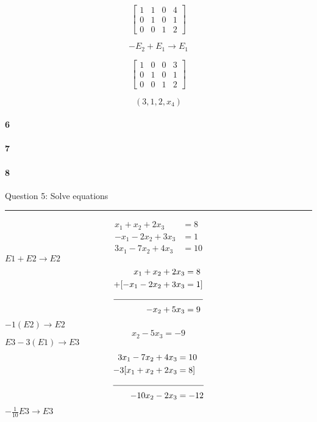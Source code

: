 \documentclass[a4paper,11pt,twoside]{report}
\begin{document}
\[\begin{bmatrix} 1 & 1 & 0 & 4 \\ 0 & 1 & 0 & 1 \\ 0 & 0 & 1 & 2 \end{bmatrix} \]

\[-E_2 + E_1 \to E_1\]

\[\begin{bmatrix} 1 & 0 & 0 & 3 \\ 0 & 1 & 0 & 1 \\ 0 & 0 & 1 & 2 \end{bmatrix} \]

\[\boxed{(3,1,2,x_4)}\]










\paragraph{6}

\paragraph{7}

\paragraph{8}







\noindent Question 5: Solve equations\\ \hrule
\begin{align*}
	x_1 + x_2 + 2x_3 &=  8 \\
	-x_1 - 2x_2 + 3x_3 &= 1 \\
	3x_1-7x_2+4x_3 &=  10
\end{align*}
$E 1 + E 2 \to E 2$
\begin{align*}
	x_1+x_2+2x_3 &= 8 \\
	+[-x_1 -2x_2+3x_3 &= 1] \\
	\cline{1-2}
	-x_2 + 5x_3 &= 9 \\
\end{align*}
$-1(E 2) \to E 2$
\[
	x_2 - 5x_3 = -9
\]
$E 3 - 3(E 1) \to E 3$
\begin{align*}
	3x_1-7x_2+4x_3 &=  10 \\
	-3[x_1 + x_2 + 2x_3 &=  8]\\
	\cline{1-2}
	-10x_2 - 2x_3 &= -12 \\
\end{align*}
$-\frac{1}{10}E 3 \to E 3$
\end{document}
